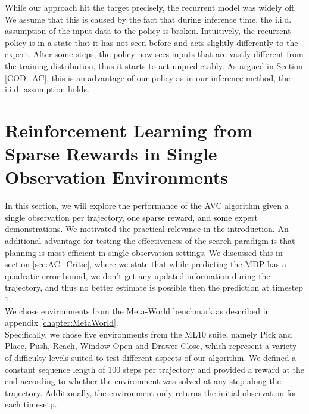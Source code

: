 While our approach hit the target precisely, the recurrent model was widely off. We assume that this is caused by the fact that during inference 
time, the
i.i.d. assumption of the input data to the policy is broken. Intuitively, the recurrent policy
is in a state that it has not seen before and acts slightly differently to the expert. After some steps, the policy now sees 
inputs that are vastly
different from the training distribution, thus it starts to act unpredictably. As argued in Section \ref{COD_AC}, this is an advantage of our 
policy as in our inference method, the i.i.d. assumption holds.

\section{Reinforcement Learning from Sparse Rewards in Single Observation Environments}
In this section, we will explore the performance of the AVC algorithm given a single observation per trajectory, one sparse reward, and some expert demonstrations.
We motivated the practical relevance in the introduction. An additional advantage for testing the effectiveness of the search paradigm is that planning is most efficient in
single observation settings.
We discussed this in section \ref{sec:AC_Critic}, where we state that while predicting the MDP has a quadratic error bound, we don't get any updated information
during the trajectory, and thus no better estimate is possible then the prediction at timestep $1$. \\

We chose environments from the Meta-World benchmark as described in appendix \ref{chapter:MetaWorld}. \\

Specifically, we chose five environments from the ML10 suite, namely Pick and Place, Push, Reach, Window Open and Drawer Close, which represent a variety
of difficulty levels suited to test different aspects of our algorithm. We defined a constant sequence length of 100 steps per trajectory and provided
a reward at the end according to whether the environment was solved at any step along the trajectory. Additionally, the environment
only returns the initial observation for each timesetp.\\

